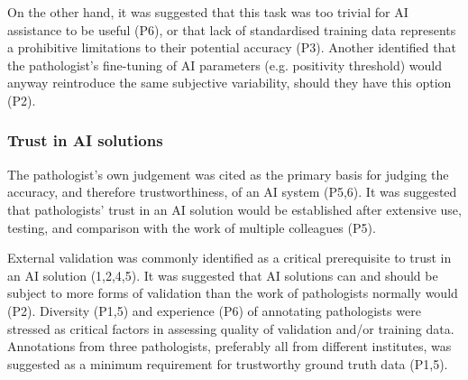 On the other hand, it was suggested that this task was too trivial for AI assistance to be useful (P6), or that lack of standardised training data represents a prohibitive limitations to their potential accuracy (P3). Another identified that the pathologist's fine-tuning of AI parameters (e.g. positivity threshold) would anyway reintroduce the same subjective variability, should they have this option (P2).

\subsubsection{Trust in AI solutions}

The pathologist's own judgement was cited as the primary basis for judging the accuracy, and therefore trustworthiness, of an AI system (P5,6). It was suggested that pathologists' trust in an AI solution would be established after extensive use, testing, and comparison with the work of multiple colleagues (P5).

External validation was commonly identified as a critical prerequisite to trust in an AI solution (1,2,4,5). It was suggested that AI solutions can and should be subject to more forms of validation than the work of pathologists normally would (P2). Diversity (P1,5) and experience (P6) of annotating pathologists were stressed as critical factors in assessing quality of validation and/or training data. Annotations from three pathologists, preferably all from different institutes, was suggested as a minimum requirement for trustworthy ground truth data (P1,5).

    
    
    
